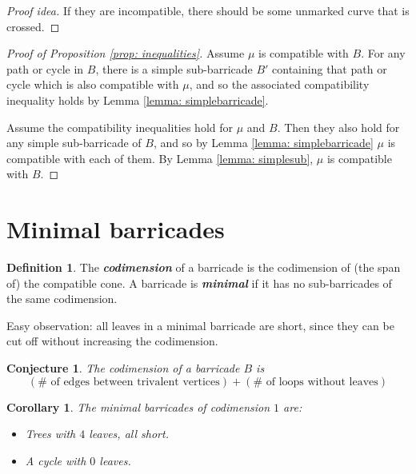 \documentclass{amsart}
\newtheorem{corollary}[proposition]{Corollary}
\newtheorem{prop}[proposition]{Proposition}
\newtheorem{conj}[proposition]{Conjecture}
\theoremstyle{definition}
\newtheorem{definition}[proposition]{Definition}
\theoremstyle{remark}
\numberwithin{equation}{section}
\newcommand{\newword}[1]{\textbf{\emph{#1}}}
\newcommand{\0}{{\mathbf{0}}}
\begin{document}
\begin{proof}[Proof idea]
If they are incompatible, there should be some unmarked curve that is crossed.
\end{proof}

\begin{proof}[Proof of Proposition \ref{prop: inequalities}]
Assume $\mu$ is compatible with $B$. For any path or cycle in $B$, there is a simple sub-barricade $B'$ containing that path or cycle which is also compatible with $\mu$, and so the associated compatibility inequality holds by Lemma \ref{lemma: simplebarricade}.

Assume the compatibility inequalities hold for $\mu$ and $B$. Then they also hold for any simple sub-barricade of $B$, and so by Lemma \ref{lemma: simplebarricade} $\mu$ is compatible with each of them. By Lemma \ref{lemma: simplesub}, $\mu$ is compatible with $B$.
\end{proof}

\section{Minimal barricades}


\begin{definition}
The \newword{codimension} of a barricade is the codimension of (the span of) the compatible cone. A barricade is \newword{minimal} if it has no sub-barricades of the same codimension.
\end{definition}

Easy observation: all leaves in a minimal barricade are short, since they can be cut off without increasing the codimension.




\begin{conj}
The codimension of a barricade $B$ is 
\[ (\text{$\#$ of edges between trivalent vertices}) + (\text{$\#$ of loops without leaves}) \]
\end{conj}

\begin{corollary}
The minimal barricades of codimension $1$ are:
\begin{itemize}
	\item Trees with $4$ leaves, all short.
	\item A cycle with $0$ leaves.
\end{itemize}
\end{corollary}
\end{document}
